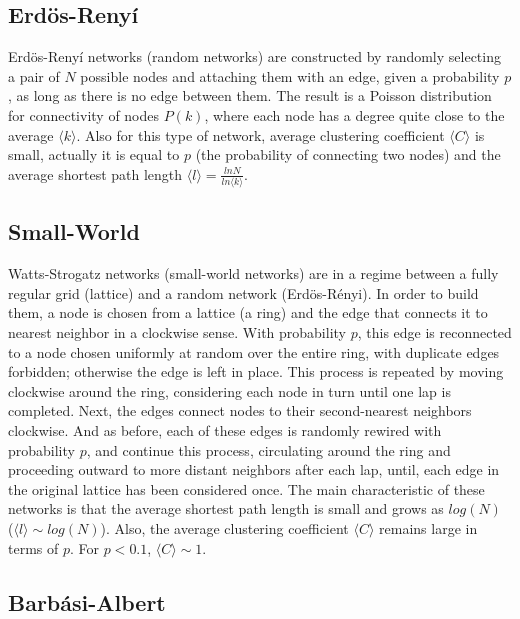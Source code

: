 \documentclass[11pt]{article}
\begin{document}
\subsection{Erd\"{o}s-Reny\'i}

Erd\"{o}s-Reny\'i networks \cite{Erdos1959} (random networks) are constructed by randomly selecting a pair of $N$ possible nodes and attaching them with an edge, given a probability $p$, as long as there is no edge between them. The result is a Poisson distribution for connectivity of nodes $P(k)$, where each node has a degree quite close to the average $\langle k \rangle$. Also for this type of network, average clustering coefficient  $\langle C \rangle$ is small, actually it is equal to $p$ (the probability of connecting two nodes) and the average shortest path length $\langle l \rangle = \frac{lnN}{ln\langle k \rangle}$.


\subsection{Small-World}

Watts-Strogatz networks \cite{Watts1998} (small-world networks) are in a regime between a fully regular grid (lattice) and a random network (Erd\"{o}s-R\'enyi). In order to build them, a node is chosen from a lattice (a ring) and the edge that connects it to nearest neighbor in a clockwise sense. With probability $p$, this edge is reconnected to a node chosen uniformly at random over the entire ring, with duplicate edges forbidden; otherwise the edge is left in place. This process is repeated by moving clockwise around the ring, considering each node in turn until one lap is completed. Next, the edges connect nodes to their second-nearest neighbors clockwise. And as before, each of these edges is randomly rewired with probability $p$, and continue this process, circulating around the ring and proceeding outward to more distant neighbors after each lap, until, each edge in the original lattice has been considered once. The main characteristic of these networks is that the average shortest path length is small and grows as $log(N)$ ($\langle l \rangle \sim log(N)$). Also, the average clustering coefficient $\langle C \rangle$ remains large in terms of $p$. For $p < 0.1$, $\langle C \rangle \sim 1$.

\subsection{Barb\'asi-Albert}
\end{document}
